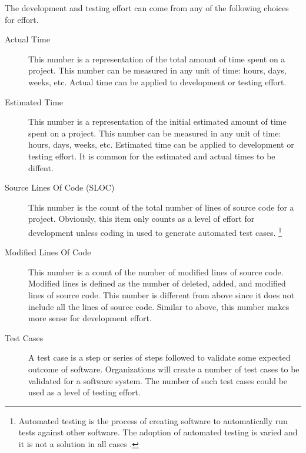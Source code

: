 \documentclass[SDSUThesis.tex]{subfiles}
\begin{document}
        The development and testing effort can come from any of 
        the following choices for effort. 
        \begin{description}
            \item[Actual Time] This number is a representation of the 
                total amount of time spent on a project.  This number
                can be measured in any unit of time: hours, days, weeks,
                etc.  Actual time can be applied to development or testing
                effort.
            \item[Estimated Time] This number is a representation of the 
                initial estimated amount of time spent on a project.  This number
                can be measured in any unit of time: hours, days, weeks,
                etc.  Estimated time can be applied to development or testing
                effort.  It is common for the estimated and actual times
                to be diffent.
            \item[Source Lines Of Code (SLOC)]  This number is the count of 
                the total number of lines of source code for a project. 
                Obviously, 
                this item only counts as a level of
                effort for development unless coding in used to generate
                automated test cases. \footnote{Automated testing is the
                process of creating software to automatically run tests
                against other software.  The adoption of automated testing
                is varied and it is not a solution in all cases 
                \cite{Ramler2006}. }
            \item[Modified Lines Of Code] This number is a count of the number 
                of modified lines of source code. Modified lines is 
                defined as the number of deleted, added, and modified 
                lines of source code.  This number is different from above
                since it does not include all the lines of source code.  Similar
                to above, this number makes more sense for development effort.
            \item[Test Cases] A test case is a step or series of steps followed
                to validate some expected outcome of software.  Organizations
                will create a number of test cases to be validated for a
                software system.  The number of such test cases could
                be used as a level of testing effort.
        \end{description}
    
\end{document}
